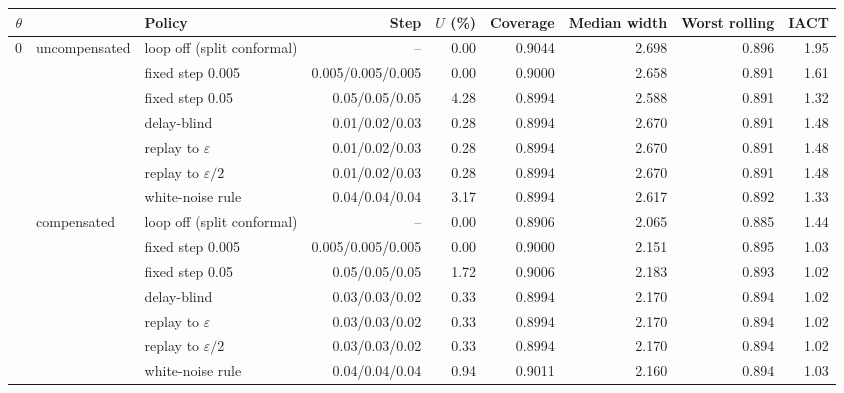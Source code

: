 \begin{tabular}{@{}rllrrrrrr@{}}
\toprule
$\theta$ & & Policy & Step & $U$ (\%) & Coverage & Median width & Worst rolling & IACT \\
\midrule
0 & uncompensated & loop off (split conformal) & -- & 0.00 & 0.9044 & 2.698 & 0.896 & 1.95 \\
 &  & fixed step 0.005 & 0.005/0.005/0.005 & 0.00 & 0.9000 & 2.658 & 0.891 & 1.61 \\
 &  & fixed step 0.05 & 0.05/0.05/0.05 & 4.28 & 0.8994 & 2.588 & 0.891 & 1.32 \\
 &  & delay-blind & 0.01/0.02/0.03 & 0.28 & 0.8994 & 2.670 & 0.891 & 1.48 \\
 &  & replay to $\varepsilon$ & 0.01/0.02/0.03 & 0.28 & 0.8994 & 2.670 & 0.891 & 1.48 \\
 &  & replay to $\varepsilon/2$ & 0.01/0.02/0.03 & 0.28 & 0.8994 & 2.670 & 0.891 & 1.48 \\
 &  & white-noise rule & 0.04/0.04/0.04 & 3.17 & 0.8994 & 2.617 & 0.892 & 1.33 \\
 & compensated & loop off (split conformal) & -- & 0.00 & 0.8906 & 2.065 & 0.885 & 1.44 \\
 &  & fixed step 0.005 & 0.005/0.005/0.005 & 0.00 & 0.9000 & 2.151 & 0.895 & 1.03 \\
 &  & fixed step 0.05 & 0.05/0.05/0.05 & 1.72 & 0.9006 & 2.183 & 0.893 & 1.02 \\
 &  & delay-blind & 0.03/0.03/0.02 & 0.33 & 0.8994 & 2.170 & 0.894 & 1.02 \\
 &  & replay to $\varepsilon$ & 0.03/0.03/0.02 & 0.33 & 0.8994 & 2.170 & 0.894 & 1.02 \\
 &  & replay to $\varepsilon/2$ & 0.03/0.03/0.02 & 0.33 & 0.8994 & 2.170 & 0.894 & 1.02 \\
 &  & white-noise rule & 0.04/0.04/0.04 & 0.94 & 0.9011 & 2.160 & 0.894 & 1.03 \\
\bottomrule
\end{tabular}

